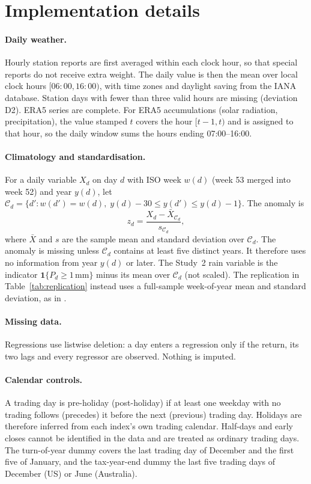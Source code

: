 \documentclass[11pt]{article}
\begin{document}
\section{Implementation details}
\label{app:implementation}

\paragraph{Daily weather.} Hourly station reports are first averaged within each clock hour, so
that special reports do not receive extra weight. The daily value is then the mean over local clock
hours $[06{:}00, 16{:}00)$, with time zones and daylight saving from the IANA database. Station days
with fewer than three valid hours are missing (deviation D2). ERA5 series are complete. For ERA5
accumulations (solar radiation, precipitation), the value stamped $t$ covers the hour $[t-1,t)$ and
is assigned to that hour, so the daily window sums the hours ending 07:00--16:00.

\paragraph{Climatology and standardisation.} For a daily variable $X_{d}$ on day $d$ with ISO week
$w(d)$ (week 53 merged into week 52) and year $y(d)$, let
$\mathcal{C}_d=\{d' : w(d')=w(d),\; y(d)-30 \le y(d') \le y(d)-1\}$. The anomaly is
\[
z_d = \frac{X_d - \bar X_{\mathcal{C}_d}}{s_{\mathcal{C}_d}},
\]
where $\bar X$ and $s$ are the sample mean and standard deviation over $\mathcal{C}_d$. The anomaly
is missing unless $\mathcal{C}_d$ contains at least five distinct years. It therefore uses no
information from year $y(d)$ or later. The Study~2 rain variable is the indicator
$\mathbf{1}\{P_d\geq 1\,\mathrm{mm}\}$ minus its mean over $\mathcal{C}_d$ (not scaled). The
replication in Table~\ref{tab:replication} instead uses a full-sample week-of-year mean and standard
deviation, as in \citet{hirshleifer2003}.

\paragraph{Missing data.} Regressions use listwise deletion: a day enters a regression only if the
return, its two lags and every regressor are observed. Nothing is imputed.

\paragraph{Calendar controls.} A trading day is pre-holiday (post-holiday) if at least one weekday
with no trading follows (precedes) it before the next (previous) trading day. Holidays are
therefore inferred from each index's own trading calendar. Half-days and early closes cannot be
identified in the data and are treated as ordinary trading days. The turn-of-year dummy covers the
last trading day of December and the first five of January, and the tax-year-end dummy the last five
trading days of December (US) or June (Australia).
\end{document}
